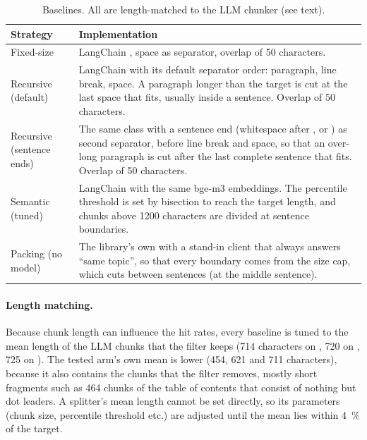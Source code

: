 \begin{table}[htbp]
  \centering
  \caption{Baselines. All are length-matched to the LLM chunker (see text).}
  \label{tab:strategies}
  \small
  \begin{tabular}{@{}L{3.2cm}L{11.3cm}@{}}
    \toprule
    Strategy & Implementation \\
    \midrule
    Fixed-size & LangChain , space as separator, overlap of 50 characters. \\
    Recursive (default) & LangChain  with its default separator order: paragraph, line break, space. A paragraph longer than the target is cut at the last space that fits, usually inside a sentence. Overlap of 50 characters. \\
    Recursive (sentence ends) & The same class with a sentence end (whitespace after , \code{!} or ) as second separator, before line break and space, so that an over-long paragraph is cut after the last complete sentence that fits. Overlap of 50 characters. \\
    Semantic (tuned) & LangChain  with the same bge-m3 embeddings. The percentile threshold is set by bisection to reach the target length, and chunks above \num{1200} characters are divided at sentence boundaries. \\
    Packing (no model) & The library's own  with a stand-in client that always answers \enquote{same topic}, so that every boundary comes from the size cap, which cuts between sentences (at the middle sentence). \\
    \bottomrule
  \end{tabular}
\end{table}

\paragraph{Length matching.} Because chunk length can influence the hit rates, every
baseline is tuned to the mean length of the LLM chunks that the filter keeps (714
characters on , 720 on , 725 on ). The tested arm's
own mean is lower (454, 621 and 711 characters), because it also contains the chunks that
the filter removes, mostly short fragments such as 464 chunks of the  table of
contents that consist of nothing but dot leaders. A splitter's mean length cannot be set
directly, so its parameters (chunk size, percentile threshold etc.) are adjusted until the
mean lies within \SI{4}{\percent} of the target.

